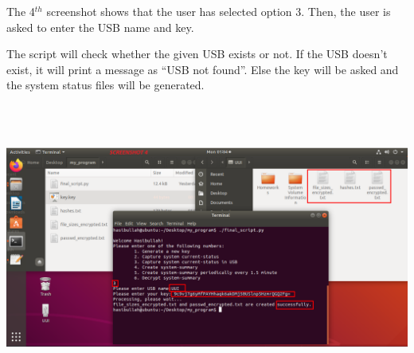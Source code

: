\documentclass{article} %
\begin{document}
\noindent 

\noindent 

\noindent 

\noindent 

\noindent 

\noindent 

\noindent 

\noindent 

\noindent 

\noindent 

\noindent 

\noindent 

\noindent 

\noindent \newline\newline \newline\newline\newline \newline\newline\newline \newline\newline\newline \newline\newline\newline\newline \newline\newline\newline The 4${}^{th}$ screenshot shows that the user has selected option 3. Then, the user is asked to enter the USB name and key.\newline

\noindent The script will check whether the given USB exists or not. If the USB doesn't exist, it will print a message as ``USB not found''. Else the key will be asked and the system status files will be generated.

\noindent \includegraphics*[width=6in, height=3.73in, keepaspectratio=false]{4.png}
\end{document}
